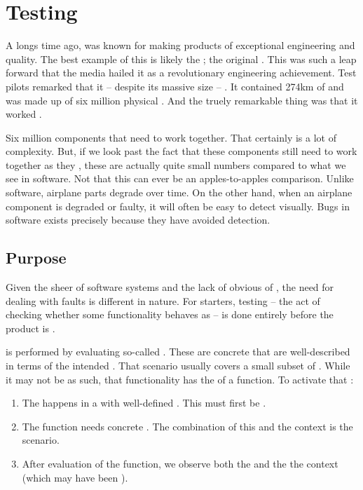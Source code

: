 \chapter{Testing}

A longs time ago,  was known for making products of exceptional engineering and quality. The best example of this is likely the ; the original . This  was such a leap forward that the media hailed it as a revolutionary engineering achievement. Test pilots remarked that it -- despite its massive size -- . It contained 274km of  and was made up of six million physical . And the truely remarkable thing was that it worked .

Six million components that need to work together. That certainly is a lot of complexity. But, if we look past the fact that these components still need to work together as they , these are actually quite small numbers compared to what we see in software. Not that this can ever be an apples-to-apples comparison. Unlike software, airplane parts degrade over time. On the other hand, when an airplane component is degraded or faulty, it will often be easy to detect visually. Bugs in software exists precisely because they have avoided detection.

\section{Purpose}

Given the sheer  of software systems and the lack of obvious  of , the need for dealing with faults is different in nature. For starters, testing -- the act of checking whether some functionality behaves as  -- is done entirely before the product is .

 is performed by evaluating so-called . These are concrete  that are well-described in terms of the intended . That scenario usually covers a small subset of . While it may not be  as such, that functionality has the  of a function. To activate that :
\begin{enumerate}
  \item The  happens in a  with well-defined . This must first be .
  \item The function needs concrete . The combination of this and the context is the scenario.
  \item After evaluation of the function, we observe both the  and the the context (which may have been ).
\end{enumerate}

